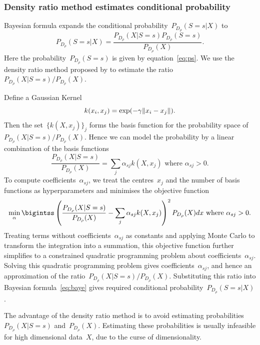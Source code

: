 \documentclass[12pt]{article} %
\DeclarePairedDelimiter{\norm}{\lVert}{\rVert}
\begin{document}
\subsubsection{Density ratio method estimates conditional probability}\label{method22}
Bayesian formula expands the conditional probability~$P_{D_\rho}(S=s|X)$ to
\begin{equation}
   P_{D_\rho}(S=s|X)=\frac{P_{D_\rho}(X|S=s)P_{D_\rho}(S=s)}{P_{D_\rho}(X)}.\label{eq:baye}
\end{equation}
Here the probability~$P_{D_\rho}(S=s)$ is given by equation~\eqref{eq:ps}. We use the density ratio method proposed by \citet{DBLP:journals/jmlr/KanamoriHS09} to estimate the ratio~${P_{D_\rho}(X|S=s)}/{P_{D_\rho}(X)}$.

Define a Gaussian Kernel
\begin{equation}\label{eq:gauss}
k(x_i,x_j)=\exp(-\gamma\norm{x_i-x_j}).
\end{equation}
Then the set~$\{k(X,x_j) \}_j$ forms the basis function for the probability space of ${P_{D_\rho}(X|S=s)}/{P_{D_\rho}(X)}$. Hence we can model the probability by a linear combination of the basis functions
\begin{equation*}
   \frac{P_{D_\rho}(X|S=s)}{P_{D_\rho}(X)}=\sum_j \alpha_{sj} k(X,x_j) \text{ where }\alpha_{sj}>0.%
\end{equation*}
To compute coefficients~$\alpha_{sj}$, we treat the centres~$x_j$ and the number of basis functions as hyperparameters and minimises the objective function
\begin{equation*}
  \min_\alpha \bigintss \left(\frac{P_{D_\rho}(X|S=s)}{P_{D_\rho}(X)}-\sum_j \alpha_{sj} k(X,x_j)\right)^2P_{D_\rho}(X)dx \text{ where }\alpha_{sj}>0.
\end{equation*}
Treating terms without coefficients~$\alpha_{sj}$ as constants and applying Monte Carlo to transform the integration into a summation, this objective function further simplifies to a constrained quadratic programming problem about coefficients~$\alpha_{sj}$. Solving this quadratic programming problem gives coefficients~$\alpha_{sj}$, and hence an approximation of the ratio~${P_{D_\rho}(X|S=s)}/{P_{D_\rho}(X)}$. Substituting this ratio into Bayesian formula~\eqref{eq:baye} gives required conditional probability~$P_{D_\rho}(S=s|X)$.

The advantage of the density ratio method is to avoid estimating probabilities~${P_{D_\rho}(X|S=s)}$ and~${P_{D_\rho}(X)}$. Estimating these probabilities is usually infeasible for high dimensional data~$X$, due to the curse of dimensionality.
\end{document}
